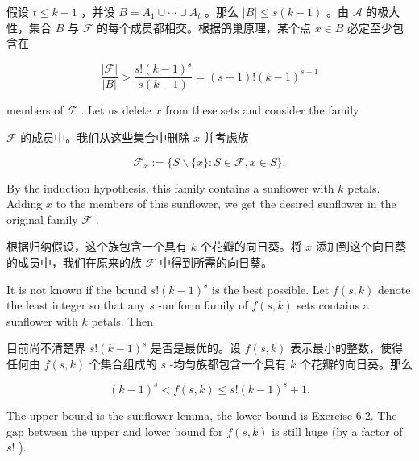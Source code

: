 \documentclass[10pt]{article}
\begin{document}
\begin{tcolorbox}\relax
假设 \(t \leq  k - 1\) ，并设 \(B = {A}_{1} \cup  \cdots  \cup  {A}_{t}\) 。那么 \(\left| B\right|  \leq  s\left( {k - 1}\right)\) 。由 \(\mathcal{A}\) 的极大性，集合 \(B\) 与 \(\mathcal{F}\) 的每个成员都相交。根据鸽巢原理，某个点 \(x \in  B\) 必定至少包含在
\end{tcolorbox}

\[
\frac{\left| \mathcal{F}\right| }{\left| B\right| } > \frac{s!{\left( k - 1\right) }^{s}}{s\left( {k - 1}\right) } = \left( {s - 1}\right) !{\left( k - 1\right) }^{s - 1}
\]

members of \(\mathcal{F}\) . Let us delete \(x\) from these sets and consider the family

\begin{tcolorbox}\relax
\(\mathcal{F}\) 的成员中。我们从这些集合中删除 \(x\) 并考虑族
\end{tcolorbox}

\[
{\mathcal{F}}_{x} \mathrel{\text{ := }} \{ S \smallsetminus  \{ x\}  : S \in  \mathcal{F},x \in  S\} .
\]

By the induction hypothesis, this family contains a sunflower with \(k\) petals. Adding \(x\) to the members of this sunflower, we get the desired sunflower in the original family \(\mathcal{F}\) .

\begin{tcolorbox}\relax
根据归纳假设，这个族包含一个具有 \(k\) 个花瓣的向日葵。将 \(x\) 添加到这个向日葵的成员中，我们在原来的族 \(\mathcal{F}\) 中得到所需的向日葵。
\end{tcolorbox}

It is not known if the bound \(s!{\left( k - 1\right) }^{s}\) is the best possible. Let \(f\left( {s,k}\right)\) denote the least integer so that any \(s\) -uniform family of \(f\left( {s,k}\right)\) sets contains a sunflower with \(k\) petals. Then

\begin{tcolorbox}\relax
目前尚不清楚界 \(s!{\left( k - 1\right) }^{s}\) 是否是最优的。设 \(f\left( {s,k}\right)\) 表示最小的整数，使得任何由 \(f\left( {s,k}\right)\) 个集合组成的 \(s\) -均匀族都包含一个具有 \(k\) 个花瓣的向日葵。那么
\end{tcolorbox}

\[
{\left( k - 1\right) }^{s} < f\left( {s,k}\right)  \leq  s!{\left( k - 1\right) }^{s} + 1. \tag{6.1}
\]

The upper bound is the sunflower lemma, the lower bound is Exercise 6.2. The gap between the upper and lower bound for \(f\left( {s,k}\right)\) is still huge (by a factor of \(s!\) ).
\end{document}
